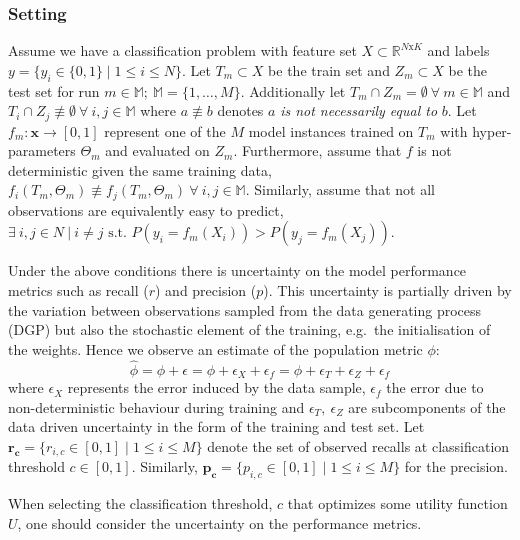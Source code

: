 \documentclass[paper=a4, fontsize=12pt]{scrartcl}
\numberwithin{equation}{section} %
\numberwithin{figure}{section} %
\numberwithin{table}{section} %
\begin{document}
\subsubsection*{Setting}
Assume we have a classification problem with feature set $X \subset \mathbb{R}^{N \mathrm{x} K}$ and labels $y = \{y_{i} \in \{0, 1\} \mid 1 \leq  i \leq N\}$.
Let $T_{m} \subset X$ be the train set and $Z_{m} \subset X$ be the test set for run $ m \in \mathbb{M};~\mathbb{M} = \{1, \ldots, M\}$.
Additionally let $T_{m} \cap Z_{m} = \emptyset~\forall~m \in \mathbb{M}$ and $T_{i} \cap Z_{j} \not\equiv \emptyset~\forall~i, j \in \mathbb{M}$ where $a \not\equiv b$ denotes $a$ \textit{is not necessarily equal to} $b$.
Let $f_{m}:\mathbf{x} \to [0, 1]$ represent one of the $M$ model instances trained on $T_{m}$ with hyper-parameters $\Theta_{m}$ and evaluated on $Z_{m}$.
Furthermore, assume that $f$ is not deterministic given the same training data, $f_{i}(T_{m}, \Theta_{m}) \not\equiv f_{j}(T_{m}, \Theta_{m})~\forall~i, j \in \mathbb{M}$.
Similarly, assume that not all observations are equivalently easy to predict, $\exists~i, j \in N~|~i \neq j \text{ s.t. } P\left(y_{i} = f_{m}(X_{i})\right) > P\left(y_{j} = f_{m}(X_{j})\right)$.
\par
Under the above conditions there is uncertainty on the model performance metrics such as recall ($r$) and precision ($p$).
This uncertainty is partially driven by the variation between observations sampled from the data generating process (DGP) but also the stochastic element of the training, e.g.\ the initialisation of the weights.
Hence we observe an estimate of the population metric $\phi$:
\begin{equation*}
    \hat{\phi} = \phi + \epsilon = \phi + \epsilon_{X} + \epsilon_{f} = \phi + \epsilon_{T} + \epsilon_{Z} + \epsilon_{f}
\end{equation*}
where $\epsilon_{X}$ represents the error induced by the data sample, $\epsilon_{f}$ the error due to non-deterministic behaviour during training and $\epsilon_{T},~\epsilon_{Z}$ are subcomponents of the data driven uncertainty in the form of the training and test set.
Let $\mathbf{r_{c}}=\{r_{i, c}\in [0, 1] \mid 1 \leq i \leq M\}$ denote the set of observed recalls at classification threshold $c \in [0, 1]$.
Similarly, $\mathbf{p_{c}}=\{p_{i, c}\in [0, 1] \mid 1 \leq i \leq M\}$ for the precision.
\par
When selecting the classification threshold, $c$ that optimizes some utility function $U$, one should consider the uncertainty on the performance metrics.
\end{document}
